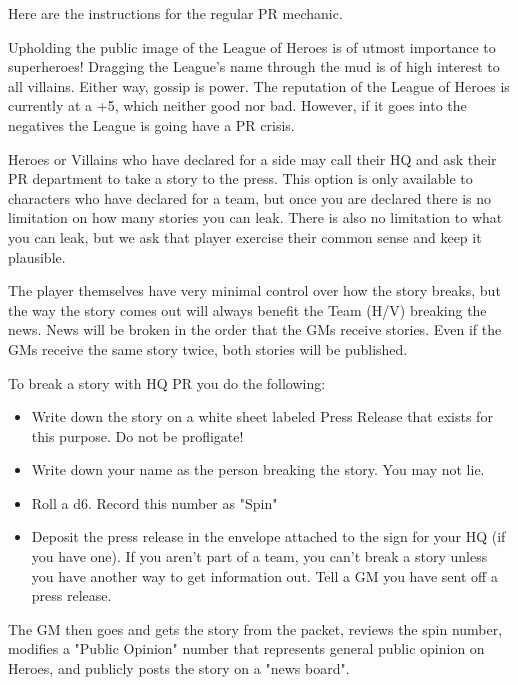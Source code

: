 \documentclass[green]{LRSguildcamp1}
\begin{document}
Here are the instructions for the regular PR mechanic. 

Upholding the public image of the League of Heroes is of utmost importance to superheroes! Dragging the League's name through the mud is of high interest to all villains. Either way, gossip is power. The reputation of the League of Heroes is currently at a +5, which neither good nor bad. However, if it goes into the negatives the League is going have a PR crisis. 

Heroes or Villains who have declared for a side may call their HQ and ask their PR department to take a story to the press. This option is only available to characters who have declared for a team, but once you are declared there is no limitation on how many stories you can leak. There is also no limitation to what you can leak, but we ask that player exercise their common sense and keep it plausible. 

The player themselves have very minimal control over how the story breaks, but the way the story comes out will always benefit the Team (H/V) breaking the news. News will be broken in the order that the GMs receive stories. Even if the GMs receive the same story twice, both stories will be published. 

To break a story with HQ PR you do the following:
\begin {itemize}
\item Write down the story on a white sheet labeled Press Release that exists for this purpose. Do not be profligate! 
\item Write down your name as the person breaking the story. You may not lie. 
\item Roll a d6. Record this number as "Spin"
\item Deposit the press release in the envelope attached to the sign for your HQ (if you have one). If you aren't part of a team, you can't break a story unless you have another way to get information out. Tell a GM you have sent off a press release.
\end {itemize}
The GM then goes and gets the story from the packet, reviews the spin number, modifies a "Public Opinion" number that represents general public opinion on Heroes, and publicly posts the story on a "news board". 
\end{document}
